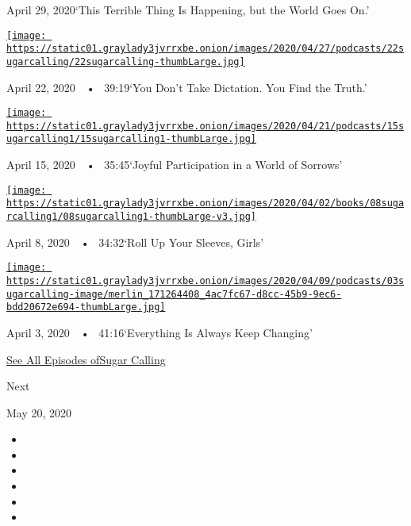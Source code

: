 April 29, 2020`This Terrible Thing Is Happening, but the World Goes On.'

\href{https://www.nytimes3xbfgragh.onion/2020/04/22/podcasts/sugar-calling-amy-tan-quarantine-virus.html?action=click\&module=audio-series-bar\&region=header\&pgtype=Article}{\texttt{[image: https://static01.graylady3jvrrxbe.onion/images/2020/04/27/podcasts/22sugarcalling/22sugarcalling-thumbLarge.jpg]}}

April 22, 2020~~•~ 39:19`You Don't Take Dictation. You Find the Truth.'

\href{https://www.nytimes3xbfgragh.onion/2020/04/15/podcasts/sugar-calling-pico-iyer-coronavirus.html?action=click\&module=audio-series-bar\&region=header\&pgtype=Article}{\texttt{[image: https://static01.graylady3jvrrxbe.onion/images/2020/04/21/podcasts/15sugarcalling1/15sugarcalling1-thumbLarge.jpg]}}

April 15, 2020~~•~ 35:45`Joyful Participation in a World of Sorrows'

\href{https://www.nytimes3xbfgragh.onion/2020/04/08/podcasts/sugar-calling-margaret-atwood-coronavirus.html?action=click\&module=audio-series-bar\&region=header\&pgtype=Article}{\texttt{[image: https://static01.graylady3jvrrxbe.onion/images/2020/04/02/books/08sugarcalling1/08sugarcalling1-thumbLarge-v3.jpg]}}

April 8, 2020~~•~ 34:32`Roll Up Your Sleeves, Girls'

\href{https://www.nytimes3xbfgragh.onion/2020/04/03/podcasts/sugar-calling-george-saunders-coronavirus.html?action=click\&module=audio-series-bar\&region=header\&pgtype=Article}{\texttt{[image: https://static01.graylady3jvrrxbe.onion/images/2020/04/09/podcasts/03sugarcalling-image/merlin\_171264408\_4ac7fc67-d8cc-45b9-9ec6-bdd20672e694-thumbLarge.jpg]}}

April 3, 2020~~•~ 41:16`Everything Is Always Keep Changing'

\href{https://www.nytimes3xbfgragh.onion/column/sugar-calling}{See All
Episodes ofSugar Calling}

Next

May 20, 2020

\begin{itemize}
\item
\item
\item
\item
\item
\item
\end{itemize}

